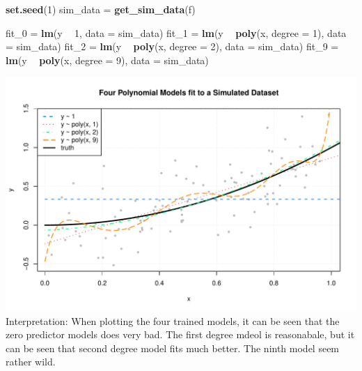 \documentclass[]{report}
\newenvironment{Shaded}{\begin{snugshade}}{\end{snugshade}}
\newcommand{\KeywordTok}[1]{\textcolor[rgb]{0.13,0.29,0.53}{\textbf{#1}}}
\newcommand{\DataTypeTok}[1]{\textcolor[rgb]{0.13,0.29,0.53}{#1}}
\newcommand{\DecValTok}[1]{\textcolor[rgb]{0.00,0.00,0.81}{#1}}
\newcommand{\StringTok}[1]{\textcolor[rgb]{0.31,0.60,0.02}{#1}}
\newcommand{\OperatorTok}[1]{\textcolor[rgb]{0.81,0.36,0.00}{\textbf{#1}}}
\newcommand{\NormalTok}[1]{#1}
\begin{document}
\begin{Shaded}
\begin{Highlighting}[]
\KeywordTok{set.seed}\NormalTok{(}\DecValTok{1}\NormalTok{)}
\NormalTok{sim_data =}\StringTok{ }\KeywordTok{get_sim_data}\NormalTok{(f)}
\end{Highlighting}
\end{Shaded}

\begin{Shaded}
\begin{Highlighting}[]
\NormalTok{fit_}\DecValTok{0}\NormalTok{ =}\StringTok{ }\KeywordTok{lm}\NormalTok{(y }\OperatorTok{~}\StringTok{ }\DecValTok{1}\NormalTok{,                   }\DataTypeTok{data =}\NormalTok{ sim_data)}
\NormalTok{fit_}\DecValTok{1}\NormalTok{ =}\StringTok{ }\KeywordTok{lm}\NormalTok{(y }\OperatorTok{~}\StringTok{ }\KeywordTok{poly}\NormalTok{(x, }\DataTypeTok{degree =} \DecValTok{1}\NormalTok{), }\DataTypeTok{data =}\NormalTok{ sim_data)}
\NormalTok{fit_}\DecValTok{2}\NormalTok{ =}\StringTok{ }\KeywordTok{lm}\NormalTok{(y }\OperatorTok{~}\StringTok{ }\KeywordTok{poly}\NormalTok{(x, }\DataTypeTok{degree =} \DecValTok{2}\NormalTok{), }\DataTypeTok{data =}\NormalTok{ sim_data)}
\NormalTok{fit_}\DecValTok{9}\NormalTok{ =}\StringTok{ }\KeywordTok{lm}\NormalTok{(y }\OperatorTok{~}\StringTok{ }\KeywordTok{poly}\NormalTok{(x, }\DataTypeTok{degree =} \DecValTok{9}\NormalTok{), }\DataTypeTok{data =}\NormalTok{ sim_data)}
\end{Highlighting}
\end{Shaded}

\includegraphics{MyBook_files/figure-latex/unnamed-chunk-106-1.pdf}
Interpretation: When plotting the four trained models, it can be seen
that the zero predictor models does very bad. The first degree mdeol is
reasonabale, but it can be seen that second degree model fits much
better. The ninth model seem rather wild.
\end{document}
